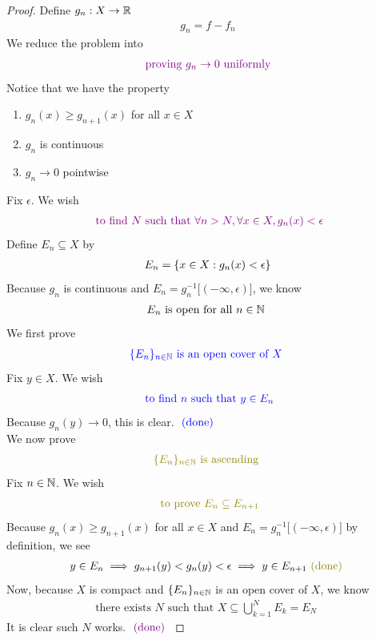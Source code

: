 \documentclass{report}
\begin{document}
\begin{proof}
  Define $g_n:X\rightarrow \mathbb{R}$ 
\begin{align*}
g_n=f-f_n
\end{align*}
We reduce the problem into 
\begin{align*}
\textcolor{violet}{\text{ proving }g_n \to 0\text{ uniformly }}
\end{align*}
Notice that we have the property 
\begin{enumerate}[label=(\alph*)]
  \item $g_n(x)\geq g_{n+1}(x)$ for all $x \in X$ 
  \item $g_n$ is continuous 
   \item $g_n \to 0$ pointwise
\end{enumerate}
Fix $\epsilon $. We wish 
\begin{align*}
\textcolor{violet}{\text{ to find $N$ such that }\forall n>N, \forall x \in X,  g_n(x)<\epsilon }
\end{align*}
Define $E_n \subseteq X$ by 
\begin{align*}
E_n= \{ x \in X: g_n(x)<\epsilon  \}
\end{align*}
Because $g_n$ is continuous and  $E_n=g_n^{-1}\Big[(-\infty,\epsilon ) \Big]$, we know 
\begin{align*}
E_n\text{ is open for all $n \in\mathbb{N}$ }
\end{align*}
We first prove 
\begin{align*}
\textcolor{blue}{\{ E_n \}_{n\in\mathbb{N}}\text{ is an open cover of $X$ }}
\end{align*}
Fix $y \in X$. We wish 
\begin{align*}
\textcolor{blue}{\text{ to find $n$ such that }y \in E_n}
\end{align*}
Because $g_n(y)\to 0$, this is clear. $\textcolor{blue}{\text{ (done) }}$\\

We now prove 
\begin{align*}
\olive{\set{E_n}_{n\inn}\text{ is ascending }}
\end{align*}
Fix $n \in\mathbb{N}$. We wish 
\begin{align*}
\olive{\text{ to prove }E_n\subseteq E_{n+1}}
\end{align*}
Because $g_n(x)\geq g_{n+1}(x)$ for all $x \in X$ and $E_n=g_{n}^{-1}\Big[(-\infty,\epsilon ) \Big]$ by definition, we see 
\begin{align*}
y \in E_n \implies g_{n+1}(y)<g_n(y)<\epsilon \implies y \in E_{n+1}\odone
\end{align*}
Now, because $X$ is compact and $\{ E_n \}_{n\in\mathbb{N}}$ is an open cover of $X$, we know  
\begin{align}
\label{Dimi1}
\text{ there exists $N$ such that  $X \subseteq \bigcup_{k=1}^N E_k= E_N$ }
\end{align}
It is clear such $N$ works.  $\textcolor{violet}{\text{ (done) }}$
\end{proof}
\end{document}
